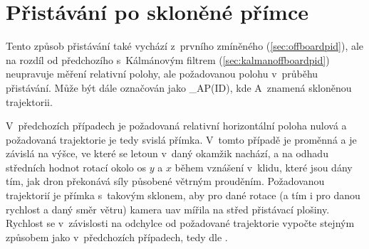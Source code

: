     \section{Přistávání po skloněné přímce} \label{sec:offboardpidangle}
        Tento způsob přistávání také vychází z~prvního zmíněného (\cref{sec:offboardpid}), ale na rozdíl od předchozího s~Kálmánovým filtrem (\cref{sec:kalmanoffboardpid}) neupravuje měření relativní polohy, ale požadovanou polohu v~průběhu přistávání. Může být dále označován jako \_AP(ID), kde A~znamená skloněnou trajektorii.
        
        V~předchozích případech je požadovaná relativní horizontální poloha nulová a požadovaná trajektorie je tedy svislá přímka. V~tomto případě je proměnná a je závislá na výšce, ve které se letoun v~daný okamžik nachází, a na odhadu středních hodnot rotací okolo os $y$ a $x$ během vznášení v~klidu, které jsou dány tím, jak dron překonává síly působené větrným prouděním. Požadovanou trajektorií je přímka s~takovým sklonem, aby pro dané rotace (a tím i pro danou rychlost a daný směr větru) kamera \acrshort{uav} mířila na střed přistávací plošiny. Rychlost se v~závislosti na odchylce od požadované trajektorie vypočte stejným způsobem jako v~předchozích případech, tedy dle .

